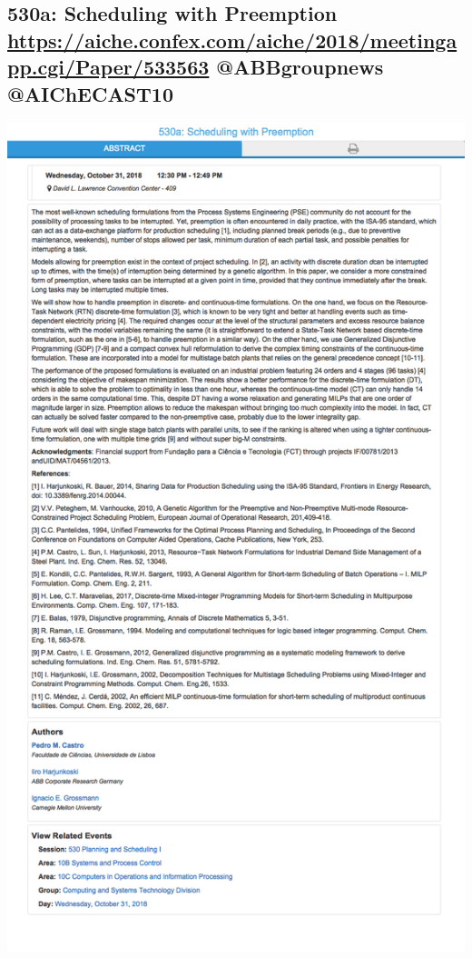 \documentclass[11pt]{article}
\begin{document}
\subsection{530a: Scheduling with Preemption \url{https://aiche.confex.com/aiche/2018/meetingapp.cgi/Paper/533563} @ABBgroupnews @AIChECAST10}
\label{sec:org1f5c924}
\begin{center}
\includegraphics[width=.9\linewidth]{./533563.png}
\end{center}
\end{document}
